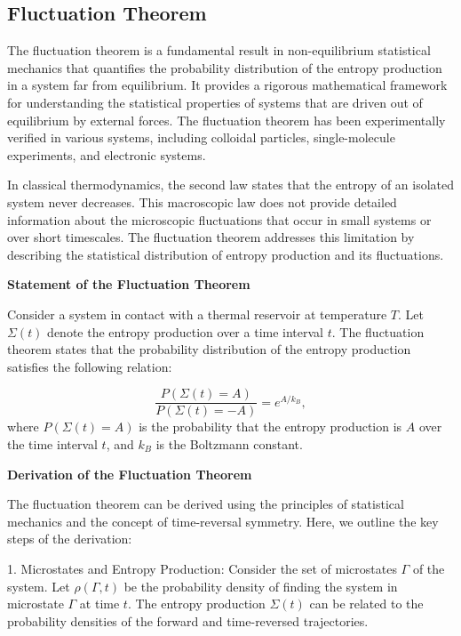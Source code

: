 \begin{appendices}
\chapter{Fluctuation Theorem\label{chapter:Appendix:FT}}
The fluctuation theorem is a fundamental result in non-equilibrium statistical mechanics that quantifies the probability distribution of the entropy production in a system far from equilibrium.\cite{EvansPRL1993} It provides a rigorous mathematical framework for understanding the statistical properties of systems that are driven out of equilibrium by external forces. The fluctuation theorem has been experimentally verified in various systems, including colloidal particles, single-molecule experiments, and electronic systems.

In classical thermodynamics, the second law states that the entropy of an isolated system never decreases. This macroscopic law does not provide detailed information about the microscopic fluctuations that occur in small systems or over short timescales. The fluctuation theorem addresses this limitation by describing the statistical distribution of entropy production and its fluctuations.

\textbf{Statement of the Fluctuation Theorem}

Consider a system in contact with a thermal reservoir at temperature $T$. Let $\Sigma(t)$ denote the entropy production over a time interval $t$. The fluctuation theorem states that the probability distribution of the entropy production satisfies the following relation:

\begin{equation}
	\frac{P(\Sigma(t) = A)}{P(\Sigma(t) = -A)} = e^{A/k_B},
\end{equation}
where $P(\Sigma(t) = A)$ is the probability that the entropy production is $A$ over the time interval $t$, and $k_B$ is the Boltzmann constant.

\textbf{Derivation of the Fluctuation Theorem}

The fluctuation theorem can be derived using the principles of statistical mechanics and the concept of time-reversal symmetry. Here, we outline the key steps of the derivation:

1. Microstates and Entropy Production: Consider the set of microstates $\Gamma$ of the system. Let $\rho(\Gamma, t)$ be the probability density of finding the system in microstate $\Gamma$ at time $t$. The entropy production $\Sigma(t)$ can be related to the probability densities of the forward and time-reversed trajectories.


\end{appendices}
